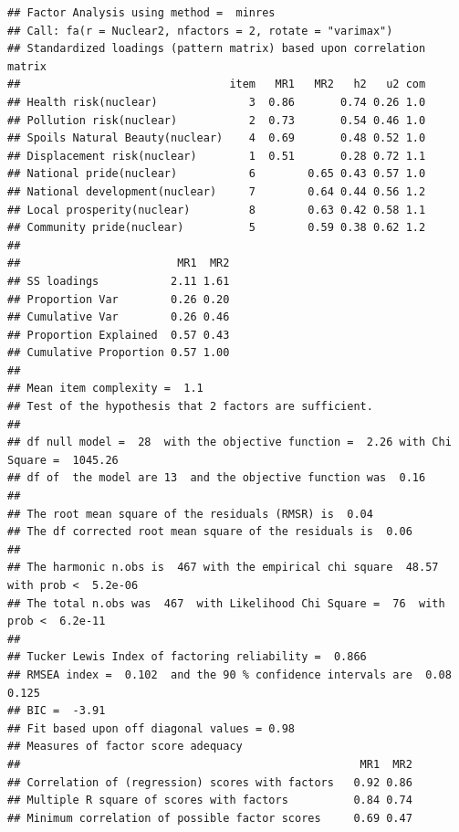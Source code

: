 \documentclass[
]{article}
\begin{document}
\begin{verbatim}
## Factor Analysis using method =  minres
## Call: fa(r = Nuclear2, nfactors = 2, rotate = "varimax")
## Standardized loadings (pattern matrix) based upon correlation matrix
##                                item   MR1   MR2   h2   u2 com
## Health risk(nuclear)              3  0.86       0.74 0.26 1.0
## Pollution risk(nuclear)           2  0.73       0.54 0.46 1.0
## Spoils Natural Beauty(nuclear)    4  0.69       0.48 0.52 1.0
## Displacement risk(nuclear)        1  0.51       0.28 0.72 1.1
## National pride(nuclear)           6        0.65 0.43 0.57 1.0
## National development(nuclear)     7        0.64 0.44 0.56 1.2
## Local prosperity(nuclear)         8        0.63 0.42 0.58 1.1
## Community pride(nuclear)          5        0.59 0.38 0.62 1.2
## 
##                        MR1  MR2
## SS loadings           2.11 1.61
## Proportion Var        0.26 0.20
## Cumulative Var        0.26 0.46
## Proportion Explained  0.57 0.43
## Cumulative Proportion 0.57 1.00
## 
## Mean item complexity =  1.1
## Test of the hypothesis that 2 factors are sufficient.
## 
## df null model =  28  with the objective function =  2.26 with Chi Square =  1045.26
## df of  the model are 13  and the objective function was  0.16 
## 
## The root mean square of the residuals (RMSR) is  0.04 
## The df corrected root mean square of the residuals is  0.06 
## 
## The harmonic n.obs is  467 with the empirical chi square  48.57  with prob <  5.2e-06 
## The total n.obs was  467  with Likelihood Chi Square =  76  with prob <  6.2e-11 
## 
## Tucker Lewis Index of factoring reliability =  0.866
## RMSEA index =  0.102  and the 90 % confidence intervals are  0.08 0.125
## BIC =  -3.91
## Fit based upon off diagonal values = 0.98
## Measures of factor score adequacy             
##                                                    MR1  MR2
## Correlation of (regression) scores with factors   0.92 0.86
## Multiple R square of scores with factors          0.84 0.74
## Minimum correlation of possible factor scores     0.69 0.47
\end{verbatim}
\end{document}
